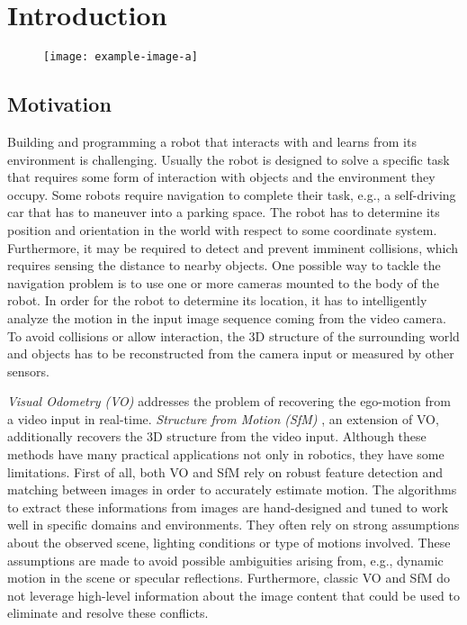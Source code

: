 \chapter{Introduction}
	
	\begin{figure}
		\centering
		\texttt{[image: example-image-a]}
		\caption{\label{fig:sfm-example}}
	\end{figure}
		
	\section{Motivation}
		
		Building and programming a robot that interacts with and learns from its environment is challenging.
		Usually the robot is designed to solve a specific task that requires some form of interaction with objects and the environment they occupy.
		Some robots require navigation to complete their task, e.g., a self-driving car that has to maneuver into a parking space.
		The robot has to determine its position and orientation in the world with respect to some coordinate system.
		Furthermore, it may be required to detect and prevent imminent collisions, which requires sensing the distance to nearby objects.
		One possible way to tackle the navigation problem is to use one or more cameras mounted to the body of the robot.
		In order for the robot to determine its location, it has to intelligently analyze the motion in the input image sequence coming from the video camera.
		To avoid collisions or allow interaction, the 3D structure of the surrounding world and objects has to be reconstructed from the camera input or measured by other sensors.
		
		\emph{Visual Odometry (VO)}  addresses the problem of recovering the ego-motion from a video input in real-time. 
		\emph{Structure from Motion (SfM)} , an extension of VO, additionally recovers the 3D structure from the video input.
		Although these methods have many practical applications not only in robotics, they have some limitations.
		First of all, both VO and SfM rely on robust feature detection and matching between images in order to accurately estimate motion.
		The algorithms to extract these informations from images are hand-designed and tuned to work well in specific domains and environments.
		They often rely on strong assumptions about the observed scene, lighting conditions or type of motions involved.
		These assumptions are made to avoid possible ambiguities arising from, e.g., dynamic motion in the scene or specular reflections.
		Furthermore, classic VO and SfM do not leverage high-level information about the image content that could be used to eliminate and resolve these conflicts.
		
